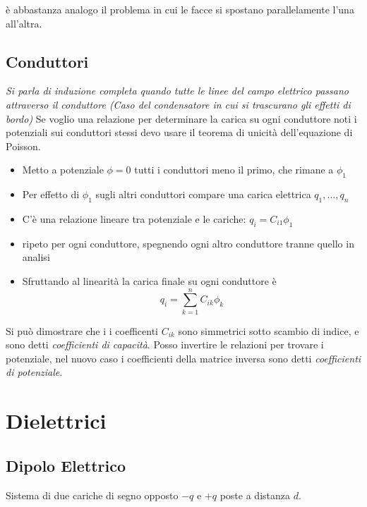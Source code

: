 \documentclass[a4paper]{scrarticle}
\begin{document}
è abbastanza analogo il problema in cui le facce si spostano parallelamente l'una all'altra.

\subsection{Conduttori}

\emph{Si parla di induzione completa quando tutte le linee del campo elettrico passano attraverso il conduttore (Caso del condensatore in cui si trascurano gli effetti di bordo)}
Se voglio una relazione per determinare la carica su ogni conduttore noti i potenziali sui conduttori stessi devo usare il teorema di unicità dell'equazione di Poisson.

\begin{itemize}
    \item Metto a potenziale $ \phi = 0 $ tutti i conduttori meno il primo, che rimane a $\phi_1$
    \item Per effetto di $\phi_1$ sugli altri conduttori compare una carica elettrica $q_1, \dots, q_n$
    \item C'è una relazione lineare tra potenziale e le cariche: $q_i = C_{i1} \phi_1$
    \item ripeto per ogni conduttore, spegnendo ogni altro conduttore tranne quello in analisi
    \item Sfruttando al linearità la carica finale su ogni conduttore è 
    \begin{equation}
        q_i = \sum_{k=1}^{n}C_{ik} \phi_k
    \end{equation}
\end{itemize}

Si può dimostrare che i i coefficenti $C_{ik}$ sono simmetrici sotto scambio di indice, e sono detti \emph{coefficienti di capacità}.
Posso invertire le relazioni per trovare i potenziale, nel nuovo caso i coefficienti della matrice inversa sono detti \emph{coefficienti di potenziale}.


\section {Dielettrici}

\subsection{Dipolo Elettrico}

Sistema di due cariche di segno opposto $-q$ e $+q$ poste a distanza $d$.
\end{document}
